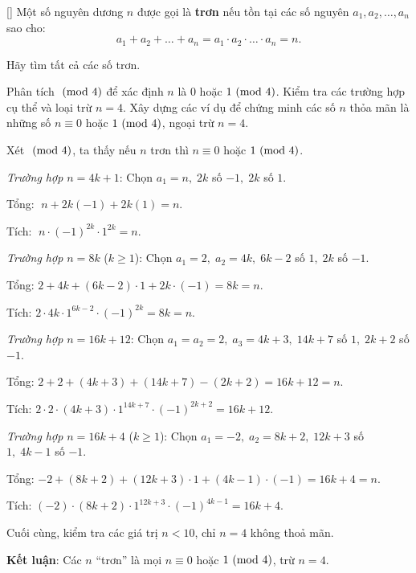 \documentclass[../02-modular-arithmetic-b.tex]{subfiles}
\begin{document}
\begin{example*}\label{example:GER-2015-MO-P2}[\textbf{}]
    Một số nguyên dương \( n \) được gọi là \textbf{trơn} nếu tồn tại các số nguyên \( a_1, a_2, \dots, a_n \) sao cho:
    \[
        a_1 + a_2 + \dots + a_n = a_1 \cdot a_2 \cdot \dots \cdot a_n = n.
    \]
    
    Hãy tìm tất cả các số trơn.
\end{example*}

\begin{story*}
    Phân tích \(\ (\mathrm{mod}\ 4)\) để xác định \(n\) là \(0\) hoặc \(1 \ (\mathrm{mod}\ 4)\). Kiểm tra các trường hợp cụ thể và loại trừ \(n = 4\). Xây dựng các ví dụ để chứng minh các số \(n\) thỏa mãn là những số \(n \equiv 0\) hoặc \(1 \ (\mathrm{mod}\ 4)\), ngoại trừ \(n = 4\).
\end{story*}

\bigbreak
\begin{soln}\footnotemark
    Xét \(\ (\mathrm{mod}\ 4)\), ta thấy nếu \( n \) trơn thì \( n \equiv 0\) hoặc \(1 \ (\mathrm{mod}\ 4)\).

    \textit{Trường hợp \( n = 4k + 1 \)}: Chọn \(a_1 = n,\; 2k\) số \(-1,\; 2k\) số \(1\).  

    Tổng: \(\;n + 2k(-1) + 2k(1) = n.\)  

    Tích: \(\;n \cdot (-1)^{2k} \cdot 1^{2k} = n.\)

    \textit{Trường hợp \( n = 8k \)} (\(k \ge 1\)):  
    Chọn \(a_1 = 2,\; a_2 = 4k,\; 6k-2\) số \(1,\; 2k\) số \(-1\).  

    Tổng: \(2 + 4k + (6k-2)\cdot 1 + 2k\cdot(-1) = 8k = n.\)  

    Tích: \(2 \cdot 4k \cdot 1^{6k-2} \cdot (-1)^{2k} = 8k = n.\)

    \textit{Trường hợp \( n = 16k + 12 \)}:  
    Chọn \(a_1 = a_2 = 2,\; a_3 = 4k + 3,\; 14k + 7\) số \(1,\; 2k + 2\) số \(-1\).  

    Tổng: \(2 + 2 + (4k+3) + (14k+7) - (2k+2) = 16k+12 = n.\)  

    Tích: \(2 \cdot 2 \cdot (4k+3) \cdot 1^{14k+7} \cdot (-1)^{2k+2} = 16k+12.\)

    \textit{Trường hợp \( n = 16k + 4 \)} (\(k \ge 1\)):  
    Chọn \(a_1 = -2,\; a_2 = 8k+2,\; 12k+3\) số \(1,\; 4k-1\) số \(-1\).  

    Tổng: \(-2 + (8k+2) + (12k+3)\cdot 1 + (4k-1)\cdot(-1) = 16k+4 = n.\)  
    
    Tích: \((-2) \cdot (8k+2) \cdot 1^{12k+3} \cdot (-1)^{4k-1} = 16k+4.\)

    Cuối cùng, kiểm tra các giá trị \(n<10\), chỉ \(n=4\) không thoả mãn.  

    \textbf{Kết luận}: Các \(n\) “trơn” là mọi \(n \equiv 0\) hoặc \(1 \ (\mathrm{mod}\ 4)\), trừ \(n=4\).
\end{soln}

\end{document}
